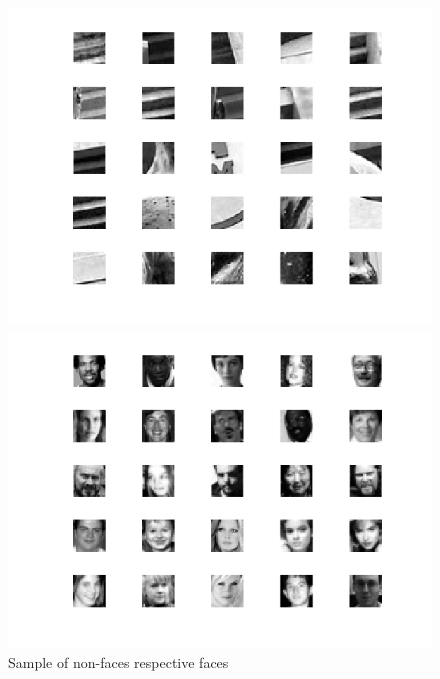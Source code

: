 \documentclass[a4paper,12pt]{article}
\begin{document}
\begin{figure}[H]
\centering
\caption{Sample of non-faces respective faces}\label{fig:sample_data_set}
  \begin{minipage}[]{0.8\textwidth}
  \includegraphics[width=\textwidth]{figures/sample_of_non_faces.png}
  \end{minipage}
    \begin{minipage}[]{0.8\textwidth}
  \includegraphics[width=\textwidth]{figures/sample_of_faces.png}
  \end{minipage}
\end{figure}
\end{document}
